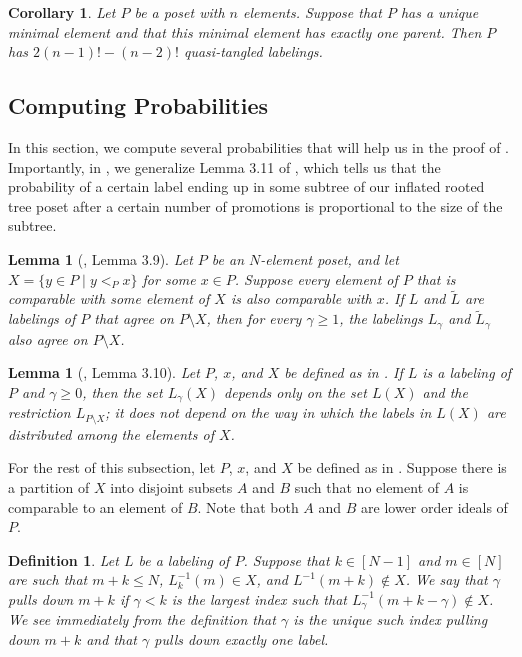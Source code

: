 \documentclass[11pt]{amsart}
\newtheorem{lemma}[thm]{Lemma}
\newtheorem{corollary}[thm]{Corollary}
\newtheorem{Definition}[thm]{Definition}
\newenvironment{definition}
{\begin{Definition}\rm}{\end{Definition}}
\theoremstyle{definition}
\newcommand{\inverse}{^{-1}}
\begin{document}
\begin{corollary}
	Let $ P $ be a poset with $ n $ elements. Suppose that $ P $ has a unique minimal element and that this minimal element has exactly one parent. Then $ P $ has $ 2(n-1)!-(n-2)! $ quasi-tangled labelings. 
\end{corollary}
\subsection{Computing Probabilities}

In this section, we compute several probabilities that will help us in the proof of . Importantly, in , we generalize Lemma 3.11 of \cite{DK20}, which tells us that the probability of a certain label ending up in some subtree of our inflated rooted tree poset after a certain number of promotions is proportional to the size of the subtree.
\begin{lemma}[\cite{DK20}, Lemma 3.9]\label{promotion dependence}
	Let $ P $ be an $ N $-element poset, and let $ X=\{y\in P\;|\;y<_Px\} $ for some $ x\in P $. Suppose every element of $ P $ that is comparable with some element of $ X $ is also comparable with $ x $. If $ L $ and $ \tilde{L} $ are labelings of $ P $ that agree on $ P\setminus X $, then for every $ \gamma\geq1 $, the labelings $ L_\gamma $ and $ \tilde{L}_\gamma $ also agree on $ P\setminus X $.
\end{lemma}
\begin{lemma}[\cite{DK20}, Lemma 3.10]\label{label distribution}
	Let $ P $, $ x $, and $ X $ be defined as in . If $ L $ is a labeling of $ P $ and $ \gamma\geq0 $, then the set $ L_\gamma(X) $ depends only on the set $ L(X) $ and the restriction $ L_{P\setminus X} $; it does not depend on the way in which the labels in $ L(X) $ are distributed among the elements of $ X $. 
\end{lemma}
For the rest of this subsection, let $ P $, $ x $, and $ X $ be defined as in .  Suppose there is a partition of $ X $ into disjoint subsets $ A $ and $ B $ such that no element of $ A $ is comparable to an element of $ B $. Note that both $ A $ and $ B $ are lower order ideals of $ P $. 

\begin{definition}\label{pulls down}
	Let $ L $ be a labeling of $ P $. Suppose that $ k\in[N-1] $ and $ m\in[N] $ are such that $ m+k\leq N $, $ L_k\inverse(m)\in X $, and $ L\inverse(m+k)\not\in X $. We say that $ \gamma $ \emph{pulls down} $ m+k $ if $ \gamma<k $ is the largest index such that $ L_{\gamma}\inverse(m+k-\gamma)\not\in X $. We see immediately from the definition that $ \gamma $ is the unique such index pulling down $ m+k $ and that $ \gamma $ pulls down exactly one label.
\end{definition}
\end{document}
